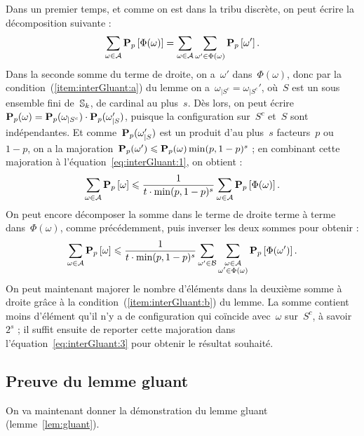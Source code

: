 		\begin{dem}
			Dans un premier temps, et comme on est dans la tribu discrète, on peut écrire la décomposition suivante :
			\begin{equation}\label{eq:interGluant:1}
				\sum_{\omega\in\mathcal{A}}\bm{\mathrm{P}}_{p}\left[\Phi(\omega)\right] = \sum_{\omega\in\mathcal{A}}\sum_{\omega'\in\Phi(\omega)}\bm{\mathrm{P}}_{p}\left[\omega'\right].
			\end{equation}
			Dans la seconde somme du terme de droite, on a~$\omega'$ dans~$\Phi(\omega)$, donc par la condition~(\ref{item:interGluant:a}) du lemme on a~$\omega_{|S^c}=\omega_{|S^c}'$, où~$S$ est un sous ensemble fini de~$\mathbb{S}_k$, de cardinal au plus~$s$. Dès lors, on peut écrire~$\bm{\mathrm{P}}_{p}(\omega) = \bm{\mathrm{P}}_{p}(\omega_{|S^c})\cdot\bm{\mathrm{P}}_{p}(\omega_{|S}')$, puisque la configuration sur~$S^c$ et~$S$ sont indépendantes. Et comme~$\bm{\mathrm{P}}_{p}(\omega_{|S}')$ est un produit d'au plus~$s$ facteurs~$p$ ou~$1-p$, on a la majoration~$\bm{\mathrm{P}}_{p}(\omega') \leqslant \bm{\mathrm{P}}_{p}(\omega)\min(p,1-p)^s$ ; en combinant cette majoration à l'équation~\ref{eq:interGluant:1}, on obtient :
			\begin{equation}\label{eq:interGluant:2}
				\sum_{\omega\in\mathcal{A}} \bm{\mathrm{P}}_{p}\left[\omega\right]
					\leqslant
					\frac{1}{t\cdot\min(p,1-p)^s}
					\sum_{\omega\in\mathcal{A}}\bm{\mathrm{P}}_{p}\left[\Phi(\omega)\right].
			\end{equation}
			On peut encore décomposer la somme dans le terme de droite terme à terme dans~$\Phi(\omega)$, comme précédemment, puis inverser les deux sommes pour obtenir :
			\begin{equation}\label{eq:interGluant:3}
				\sum_{\omega\in\mathcal{A}} \bm{\mathrm{P}}_{p}\left[\omega\right]
					\leqslant
					\frac{1}{t\cdot\min(p,1-p)^s}
					\sum_{\omega'\in\mathcal{B}}
					\sum_{\substack{\omega\in\mathcal{A}\\ \omega'\in\Phi(\omega)}}\bm{\mathrm{P}}_{p}\left[\Phi(\omega')\right].				
			\end{equation}
			On peut maintenant majorer le nombre d'éléments dans la deuxième somme à droite grâce à la condition~(\ref{item:interGluant:b}) du lemme. La somme contient moins d'élément qu'il n'y a de configuration qui coïncide avec~$\omega$ sur~$S^c$, à savoir~$2^s$ ; il suffit ensuite de reporter cette majoration dans l'équation~\ref{eq:interGluant:3} pour obtenir le résultat souhaité.    
		\end{dem}
	
	\subsection{Preuve du lemme gluant}
		On va maintenant donner la démonstration du lemme gluant (lemme~\ref{lem:gluant}).
